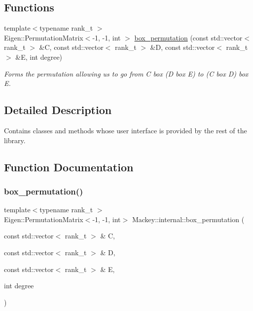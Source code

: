 \subsection*{Functions}
\begin{DoxyCompactItemize}
\item 
{\footnotesize template$<$typename rank\+\_\+t $>$ }\\Eigen\+::\+Permutation\+Matrix$<$-\/1, -\/1, int $>$ \hyperlink{namespaceMackey_1_1internal_a32720f4fc1f6777a8e13a2e0db0bd2da}{box\+\_\+permutation} (const std\+::vector$<$ rank\+\_\+t $>$ \&C, const std\+::vector$<$ rank\+\_\+t $>$ \&D, const std\+::vector$<$ rank\+\_\+t $>$ \&E, int degree)
\begin{DoxyCompactList}\small\item\em Forms the permutation allowing us to go from C box (D box E) to (C box D) box E. \end{DoxyCompactList}\end{DoxyCompactItemize}


\subsection{Detailed Description}
Contains classes and methods whose user interface is provided by the rest of the library. 

\subsection{Function Documentation}
\mbox{\label{namespaceMackey_1_1internal_a32720f4fc1f6777a8e13a2e0db0bd2da}} 
\subsubsection{\texorpdfstring{box\+\_\+permutation()}{box\_permutation()}}
{\footnotesize\ttfamily template$<$typename rank\+\_\+t $>$ \\
Eigen\+::\+Permutation\+Matrix$<$-\/1, -\/1, int$>$ Mackey\+::internal\+::box\+\_\+permutation (\begin{DoxyParamCaption}\item[{const std\+::vector$<$ rank\+\_\+t $>$ \&}]{C,  }\item[{const std\+::vector$<$ rank\+\_\+t $>$ \&}]{D,  }\item[{const std\+::vector$<$ rank\+\_\+t $>$ \&}]{E,  }\item[{int}]{degree }\end{DoxyParamCaption})}



